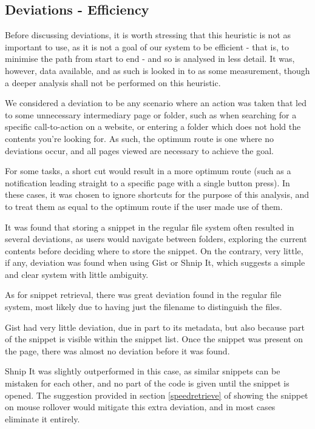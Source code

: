 
\subsection{Deviations - Efficiency}
Before discussing deviations, it is worth stressing that this heuristic is not as important to use, as it is not a goal of our system to be efficient - that is, to minimise the path from start to end - and so is analysed in less detail.
It was, however, data available, and as such is looked in to as some measurement, though a deeper analysis shall not be performed on this heuristic.

We considered a deviation to be any scenario where an action was taken that led to some unnecessary intermediary page or folder, such as when searching for a specific call-to-action on a website, or entering a folder which does not hold the contents you're looking for.
As such, the optimum route is one where no deviations occur, and all pages viewed are necessary to achieve the goal.

For some tasks, a short cut would result in a more optimum route (such as a notification leading straight to a specific page with a single button press). In these cases, it was chosen to ignore shortcuts for the purpose of this analysis, and to treat them as equal to the optimum route if the user made use of them.

It was found that storing a snippet in the regular file system often resulted in several deviations, as users would navigate between folders, exploring the current contents before deciding where to store the snippet.
On the contrary, very little, if any, deviation was found when using Gist or Shnip It, which suggests a simple and clear system with little ambiguity.

As for snippet retrieval, there was great deviation found in the regular file system, most likely due to having just the filename to distinguish the files. 

Gist had very little deviation, due in part to its metadata, but also because part of the snippet is visible within the snippet list.
Once the snippet was present on the page, there was almost no deviation before it was found.

Shnip It was slightly outperformed in this case, as similar snippets can be mistaken for each other, and no part of the code is given until the snippet is opened.
The suggestion provided in section \ref{speedretrieve} of showing the snippet on mouse rollover would mitigate this extra deviation, and in most cases eliminate it entirely.

